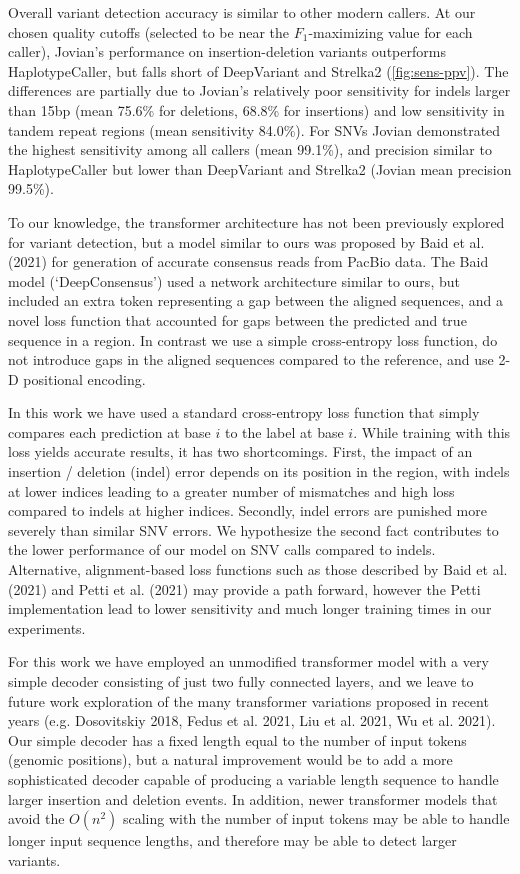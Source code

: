 \documentclass[]{article}
\begin{document}
Overall variant detection accuracy is similar to other modern callers. At our chosen quality cutoffs (selected to be near the $F_1$-maximizing value for each caller), Jovian's performance on insertion-deletion variants outperforms HaplotypeCaller, but falls short of DeepVariant and Strelka2 (\ref{fig:sens-ppv}). The differences are partially due to Jovian's relatively poor sensitivity for indels larger than 15bp (mean 75.6\% for deletions, 68.8\% for insertions) and low sensitivity in tandem repeat regions (mean sensitivity 84.0\%).  For SNVs Jovian demonstrated the highest sensitivity among all callers (mean 99.1\%), and precision similar to HaplotypeCaller but lower than DeepVariant and Strelka2 (Jovian mean precision 99.5\%). 

To our knowledge, the transformer architecture has not been previously explored for variant detection, but a model similar to ours was proposed by Baid et al. (2021) for generation of accurate consensus reads from PacBio data. The Baid model (`DeepConsensus') used a network architecture similar to ours, but included an extra token representing a gap between the aligned sequences, and a novel loss function that accounted for gaps between the predicted and true sequence in a region. In contrast we use a simple cross-entropy loss function, do not introduce gaps in the aligned sequences compared to the reference, and use 2-D positional encoding.  

In this work we have used a standard cross-entropy loss function that simply compares each prediction at base $i$ to the label at base $i$. While training with this loss yields accurate results, it has two shortcomings. First, the impact of an insertion / deletion (indel) error depends on its position in the region, with indels at lower indices leading to a greater number of mismatches and high loss compared to indels at higher indices. Secondly, indel errors are punished more severely than similar SNV errors. We hypothesize the second fact contributes to the lower performance of our model on SNV calls compared to indels. Alternative, alignment-based loss functions such as those described by Baid et al. (2021) and Petti et al. (2021) may provide a path forward, however the Petti implementation lead to lower sensitivity and much longer training times in our experiments. 

For this work we have employed an unmodified transformer model with a very simple decoder consisting of just two fully connected layers, and we leave to future work exploration of the many transformer variations proposed in recent years (e.g. Dosovitskiy 2018, Fedus et al. 2021, Liu et al. 2021, Wu et al. 2021). Our simple decoder has a fixed length equal to the number of input tokens (genomic positions), but a natural improvement would be to add a more sophisticated decoder capable of producing a variable length sequence to handle larger insertion and deletion events.  In addition, newer transformer models that avoid the $O(n^2)$ scaling with the number of input tokens may be able to handle longer input sequence lengths, and therefore may be able to detect larger variants. 
\end{document}
